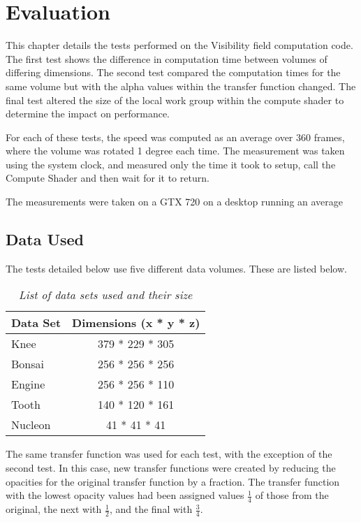 \chapter{Evaluation}

This chapter details the tests performed on the Visibility field computation code. The first test shows the difference in computation time between volumes of differing dimensions. The second test compared the computation times for the same volume but with the alpha values within the transfer function changed. The final test altered the size of the local work group within the compute shader to determine the impact on performance.

For each of these tests, the speed was computed as an average over 360 frames, where the volume was rotated 1 degree each time. The measurement was taken using the system clock, and measured only the time it took to setup, call the Compute Shader and then wait for it to return.

The measurements were taken on a GTX 720 on a desktop running an average 

\section{Data Used}

The tests detailed below use five different data volumes. These are listed below.

\begin{table}

\begin{center}
\begin{tabular}{l|c}
Data Set & Dimensions (x * y * z) \\
\hline
\hline
Knee & 379 * 229 * 305 \\
Bonsai & 256 * 256 * 256 \\
Engine & 256 * 256 * 110 \\
Tooth & 140 * 120 * 161 \\
Nucleon & 41 * 41 * 41 
\end{tabular}
\end{center}
\caption{\textit{List of data sets used and their size}}
\end{table}

The same transfer function was used for each test, with the exception of  the second test. In this case, new transfer functions were created by reducing the opacities for the original transfer function by a fraction. The transfer function with the lowest opacity values had been assigned values $\frac{1}{4}$ of those from the original, the next with $\frac{1}{2}$, and the final with $\frac{3}{4}$. 

